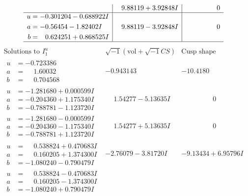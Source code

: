 \documentclass[1p]{elsarticle_modified}
\theoremstyle{definition}
\newcommand{\I}{\sqrt{-1}}
\begin{document}
$$\begin{array}{c|c|c}
 & \phantom{-}9.88119 + 3.92848 I & \phantom{-0.000000 } 0 \\ \hline\begin{aligned}
u &= -0.301204 - 0.688922 I \\
a &= -0.56454 - 1.82402 I \\
b &= \phantom{-}0.624251 + 0.868525 I\end{aligned}
 & \phantom{-}9.88119 - 3.92848 I & \phantom{-0.000000 } 0\\
 \hline 
 \end{array}$$\newpage$$\begin{array}{c|c|c}  
\text{Solutions to }I^u_{1}& \I (\text{vol} + \sqrt{-1}CS) & \text{Cusp shape}\\
 \hline 
\begin{aligned}
u &= -0.723386\phantom{ +0.000000I} \\
a &= \phantom{-}1.60032\phantom{ +0.000000I} \\
b &= \phantom{-}0.704568\phantom{ +0.000000I}\end{aligned}
 & -0.943143\phantom{ +0.000000I} & -10.4180\phantom{ +0.000000I} \\ \hline\begin{aligned}
u &= -1.281680 + 0.000599 I \\
a &= -0.204360 + 1.175340 I \\
b &= -0.788781 - 1.123720 I\end{aligned}
 & \phantom{-}1.54277 - 5.13635 I & \phantom{-0.000000 } 0 \\ \hline\begin{aligned}
u &= -1.281680 - 0.000599 I \\
a &= -0.204360 - 1.175340 I \\
b &= -0.788781 + 1.123720 I\end{aligned}
 & \phantom{-}1.54277 + 5.13635 I & \phantom{-0.000000 } 0 \\ \hline\begin{aligned}
u &= \phantom{-}0.538824 + 0.470683 I \\
a &= \phantom{-}0.160205 + 1.374300 I \\
b &= -1.080240 - 0.790479 I\end{aligned}
 & -2.76079 - 3.81720 I & -9.13434 + 6.95796 I \\ \hline\begin{aligned}
u &= \phantom{-}0.538824 - 0.470683 I \\
a &= \phantom{-}0.160205 - 1.374300 I \\
b &= -1.080240 + 0.790479 I\end{aligned}

\end{array}$$
\end{document}
